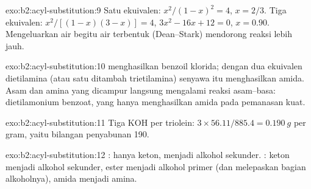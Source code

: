 \begin{solution}{exo:b2:acyl-substitution:9}
Satu ekuivalen: $x^2/(1 - x)^2 = 4$, $x = 2/3$. Tiga ekuivalen: $x^2/[(1 - x)(3 - x)] = 4$, $3x^2 - 16x
+ 12 = 0$, $x = 0.90$. Mengeluarkan air begitu air terbentuk (Dean--Stark)
mendorong reaksi lebih jauh.
\end{solution}

\begin{solution}{exo:b2:acyl-substitution:10}
 menghasilkan benzoil klorida; dengan dua ekuivalen dietilamina
(atau satu ditambah trietilamina) senyawa itu menghasilkan amida. Asam dan
amina yang dicampur langsung mengalami reaksi asam--basa: dietilamonium
benzoat, yang hanya menghasilkan amida pada pemanasan kuat.
\end{solution}

\begin{solution}{exo:b2:acyl-substitution:11}
Tiga KOH per triolein: $3 \times 56.11/885.4 = \qty{0.190}{g}$ per gram, yaitu
bilangan penyabunan 190.
\end{solution}

\begin{solution}{exo:b2:acyl-substitution:12}
: hanya keton, menjadi alkohol sekunder. : keton menjadi
alkohol sekunder, ester menjadi alkohol primer (dan melepaskan bagian
alkoholnya), amida menjadi amina.
\end{solution}


